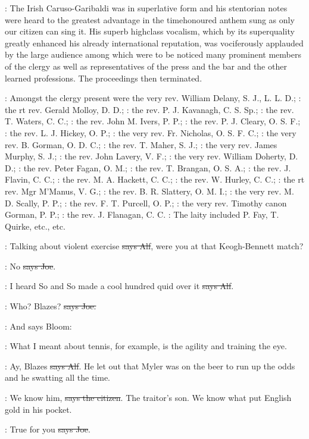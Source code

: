 :
The Irish Caruso-Garibaldi
was in superlative form and his stentorian notes were heard to the
greatest advantage in the timehonoured anthem sung as only our citizen
can sing it. His superb highclass vocalism, which by its superquality
greatly enhanced his already international reputation, was vociferously
applauded by the large audience among which were to be noticed many
prominent members of the clergy as well as representatives of the press
and the bar and the other learned professions. The proceedings then
terminated.

:
Amongst the clergy present were
the very rev. William Delany, S. J., L. L. D.;
:
the rt rev. Gerald Molloy, D. D.;
:
the rev. P. J. Kavanagh, C. S. Sp.;
:
the rev. T. Waters, C. C.; 
:
the rev. John M. Ivers, P. P.; 
:
the rev. P. J. Cleary, O. S. F.; 
:
the rev. L. J. Hickey, O. P.; 
:
the very rev. Fr. Nicholas, O. S. F. C.; 
:
the very rev. B. Gorman, O. D. C.; 
:
the rev. T. Maher, S. J.; 
:
the very rev. James Murphy, S. J.; 
:
the rev. John Lavery, V. F.; 
:
the very rev. William Doherty, D. D.; 
:
the rev. Peter Fagan, O. M.; 
:
the rev. T. Brangan, O. S. A.; 
:
the rev. J. Flavin, C. C.; 
:
the rev. M. A. Hackett, C. C.; 
:
the rev. W. Hurley, C. C.; 
:
the rt rev. Mgr M'Manus, V. G.; 
:
the rev. B. R. Slattery, O. M. I.; 
:
the very rev. M. D. Scally, P. P.; 
:
the rev. F. T. Purcell, O. P.; 
:
the very rev. Timothy canon Gorman, P. P.; 
:
the rev. J. Flanagan, C. C. 
:
The laity included P. Fay, T. Quirke, etc., etc.

\bergan:
Talking about violent exercise \sout{says Alf},
were you at that Keogh-Bennett match?

\joe:
No \sout{says Joe}.

\bergan:
I heard So and So made a cool hundred quid
over it \sout{says Alf}.

\joe:
Who? Blazes? \sout{says Joe.}

\Nq:
And says Bloom:

\Bloom:
What I meant about tennis, for example,
is the agility and training the eye.

\bergan:
Ay, Blazes \sout{says Alf}.
He let out that Myler was on the beer to run up
the odds and he swatting all the time.

\citizen:
We know him, \sout{says the citizen}.
The traitor's son. We know what put
English gold in his pocket.

\joe:
True for you \sout{says Joe}.

